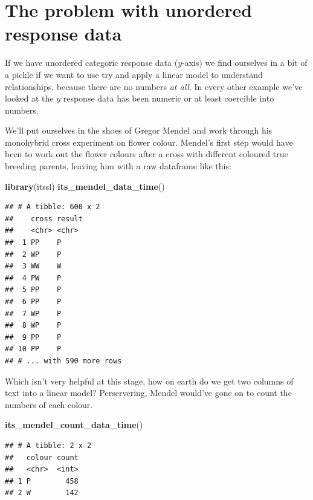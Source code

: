 \documentclass[
]{book}
\newenvironment{Shaded}{\begin{snugshade}}{\end{snugshade}}
\newcommand{\KeywordTok}[1]{\textcolor[rgb]{0.13,0.29,0.53}{\textbf{#1}}}
\newcommand{\NormalTok}[1]{#1}
\begin{document}
\hypertarget{the-problem-with-unordered-response-data}{%
\section{The problem with unordered response data}\label{the-problem-with-unordered-response-data}}

If we have unordered categoric response data (\(y\)-axis) we find ourselves in a bit of a pickle if we want to use try and apply a linear model to understand relationships, because there are no numbers \emph{at all}. In every other example we've looked at the \(y\) response data has been numeric or at least coercible into numbers.

We'll put ourselves in the shoes of Gregor Mendel and work through his monohybrid cross experiment on flower colour. Mendel's first step would have been to work out the flower colours after a cross with different coloured true breeding parents, leaving him with a raw dataframe like this:

\begin{Shaded}
\begin{Highlighting}[]
\KeywordTok{library}\NormalTok{(itssl)}
\KeywordTok{its_mendel_data_time}\NormalTok{()}
\end{Highlighting}
\end{Shaded}

\begin{verbatim}
## # A tibble: 600 x 2
##    cross result
##    <chr> <chr> 
##  1 PP    P     
##  2 WP    P     
##  3 WW    W     
##  4 PW    P     
##  5 PP    P     
##  6 PP    P     
##  7 WP    P     
##  8 WP    P     
##  9 PP    P     
## 10 PP    P     
## # ... with 590 more rows
\end{verbatim}

Which isn't very helpful at this stage, how on earth do we get two columns of text into a linear model? Perservering, Mendel would've gone on to count the numbers of each colour.

\begin{Shaded}
\begin{Highlighting}[]
\KeywordTok{its_mendel_count_data_time}\NormalTok{()}
\end{Highlighting}
\end{Shaded}

\begin{verbatim}
## # A tibble: 2 x 2
##   colour count
##   <chr>  <int>
## 1 P        458
## 2 W        142
\end{verbatim}
\end{document}
